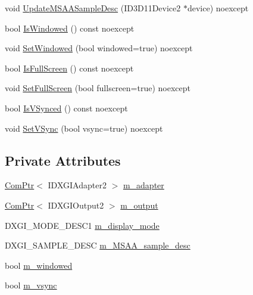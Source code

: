 \begin{DoxyCompactItemize}
\item 
void \hyperlink{structmage_1_1_display_configuration_a8eb7b1f0d0dbdd7ab384f61955609496}{Update\+M\+S\+A\+A\+Sample\+Desc} (I\+D3\+D11\+Device2 $\ast$device) noexcept
\item 
bool \hyperlink{structmage_1_1_display_configuration_ae35fedcd9989950c5f15785632dd7a86}{Is\+Windowed} () const noexcept
\item 
void \hyperlink{structmage_1_1_display_configuration_ac6228139b3fae3b5fb454aa072b94efd}{Set\+Windowed} (bool windowed=true) noexcept
\item 
bool \hyperlink{structmage_1_1_display_configuration_ab984b32ff2b6ce6a376aa09399b9b45e}{Is\+Full\+Screen} () const noexcept
\item 
void \hyperlink{structmage_1_1_display_configuration_a570746cd01c6a95c217aa03a954b5fd1}{Set\+Full\+Screen} (bool fullscreen=true) noexcept
\item 
bool \hyperlink{structmage_1_1_display_configuration_ab237c9b7953853eb83a51d542dfffb5e}{Is\+V\+Synced} () const noexcept
\item 
void \hyperlink{structmage_1_1_display_configuration_a7a14343be4f07dcdf4e8be66a118da29}{Set\+V\+Sync} (bool vsync=true) noexcept
\end{DoxyCompactItemize}
\subsection*{Private Attributes}
\begin{DoxyCompactItemize}
\item 
\hyperlink{namespacemage_ae74f374780900893caa5555d1031fd79}{Com\+Ptr}$<$ I\+D\+X\+G\+I\+Adapter2 $>$ \hyperlink{structmage_1_1_display_configuration_a3a731fa68cb3924f0528115930073d77}{m\+\_\+adapter}
\item 
\hyperlink{namespacemage_ae74f374780900893caa5555d1031fd79}{Com\+Ptr}$<$ I\+D\+X\+G\+I\+Output2 $>$ \hyperlink{structmage_1_1_display_configuration_a483b3b999f4736084daa819a15adfb80}{m\+\_\+output}
\item 
D\+X\+G\+I\+\_\+\+M\+O\+D\+E\+\_\+\+D\+E\+S\+C1 \hyperlink{structmage_1_1_display_configuration_ac59d5e7c5553ef4842090bf1a83bd7ca}{m\+\_\+display\+\_\+mode}
\item 
D\+X\+G\+I\+\_\+\+S\+A\+M\+P\+L\+E\+\_\+\+D\+E\+SC \hyperlink{structmage_1_1_display_configuration_a1d4de267f8edcd0044252b9658f426c3}{m\+\_\+\+M\+S\+A\+A\+\_\+sample\+\_\+desc}
\item 
bool \hyperlink{structmage_1_1_display_configuration_a0c447e4bd7ea72313315c657e9cd0d95}{m\+\_\+windowed}
\item 
bool \hyperlink{structmage_1_1_display_configuration_a22dd3b35e58260c9555a37aef0e85a4d}{m\+\_\+vsync}
\end{DoxyCompactItemize}


